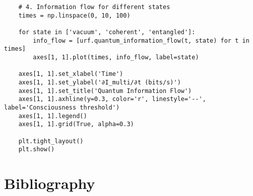\documentclass[openany]{memoir}
\theoremstyle{definition}
\theoremstyle{plain}
\theoremstyle{remark}
\begin{document}
\begin{lstlisting}
    # 4. Information flow for different states
    times = np.linspace(0, 10, 100)
    
    for state in ['vacuum', 'coherent', 'entangled']:
        info_flow = [urf.quantum_information_flow(t, state) for t in times]
        axes[1, 1].plot(times, info_flow, label=state)
    
    axes[1, 1].set_xlabel('Time')
    axes[1, 1].set_ylabel('∂I_multi/∂t (bits/s)')
    axes[1, 1].set_title('Quantum Information Flow')
    axes[1, 1].axhline(y=0.3, color='r', linestyle='--', label='Consciousness threshold')
    axes[1, 1].legend()
    axes[1, 1].grid(True, alpha=0.3)
    
    plt.tight_layout()
    plt.show()
\end{lstlisting}

\backmatter

\chapter*{Bibliography}
\end{document}
